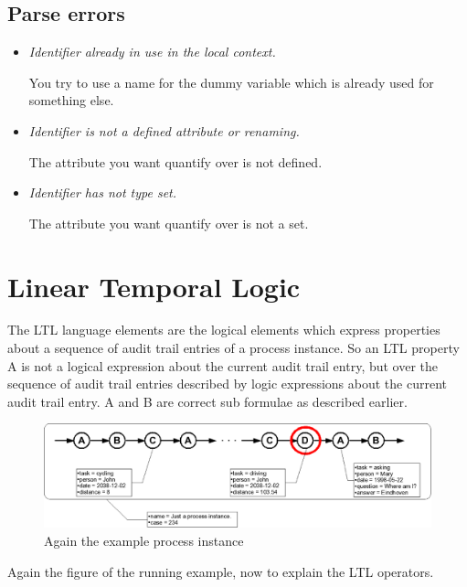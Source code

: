 \subsection{Parse errors}

\begin{itemize}

\item \textit{Identifier already in use in the local context.}

You try to use a name for the dummy variable which is already used for
something else.

\item \textit{Identifier is not a defined attribute or renaming.}

The attribute you want quantify over is not defined.

\item \textit{Identifier has not type set.}

The attribute you want quantify over is not a set.

\end{itemize}

\section{Linear Temporal Logic}
\label{language:ltl}

The LTL language elements are the logical elements which express properties
about a sequence of audit trail entries of a process instance. So an LTL
property A is not a logical expression about the current audit trail entry,
but over the sequence of audit trail entries described by logic expressions
about the current audit trail entry. A and B are correct sub formulae as
described earlier.

\begin{figure}[H]
    \includegraphics[scale=0.30]{diagrams/current-process-instance.eps}
    \caption{Again the example process instance}
    \label{language:pi04}
\end{figure}

Again the figure of the running example, now to explain the LTL operators.

